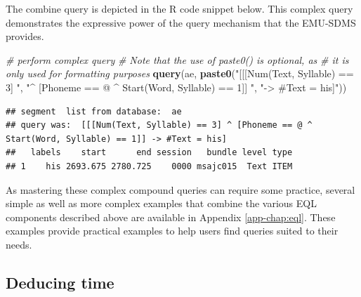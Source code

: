 \documentclass[]{book}
\newenvironment{Shaded}{\begin{snugshade}}{\end{snugshade}}
\newcommand{\CommentTok}[1]{\textcolor[rgb]{0.56,0.35,0.01}{\textit{#1}}}
\newcommand{\KeywordTok}[1]{\textcolor[rgb]{0.13,0.29,0.53}{\textbf{#1}}}
\newcommand{\NormalTok}[1]{#1}
\newcommand{\StringTok}[1]{\textcolor[rgb]{0.31,0.60,0.02}{#1}}
\begin{document}
The combine query is depicted in the R code snippet below. This complex query demonstrates the expressive power of the query mechanism that the EMU-SDMS provides.

\begin{Shaded}
\begin{Highlighting}[]
\CommentTok{# perform complex query}
\CommentTok{# Note that the use of paste0() is optional, as}
\CommentTok{# it is only used for formatting purposes}
\KeywordTok{query}\NormalTok{(ae, }\KeywordTok{paste0}\NormalTok{(}\StringTok{"[[[Num(Text, Syllable) == 3] "}\NormalTok{,}
                 \StringTok{"^ [Phoneme == @ ^ Start(Word, Syllable) == 1]] "}\NormalTok{,}
                 \StringTok{"-> #Text = his]"}\NormalTok{))}
\end{Highlighting}
\end{Shaded}

\begin{verbatim}
## segment  list from database:  ae 
## query was:  [[[Num(Text, Syllable) == 3] ^ [Phoneme == @ ^ Start(Word, Syllable) == 1]] -> #Text = his] 
##   labels    start      end session   bundle level type
## 1    his 2693.675 2780.725    0000 msajc015  Text ITEM
\end{verbatim}

As mastering these complex compound queries can require some practice, several simple as well as more complex examples that combine the various EQL components described above are available in Appendix \ref{app-chap:eql}. These examples provide practical examples to help users find queries suited to their needs.

\hypertarget{subsec:query_deducingTime}{%
\subsection{Deducing time}\label{subsec:query_deducingTime}}
\end{document}
